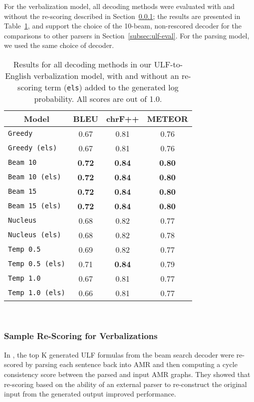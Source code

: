 For the verbalization model, all decoding methods were evaluated with and without the \elsmatch re-scoring described in Section~\ref{subsec:rescoring}; the results are presented in Table~\ref{T3}, and support the choice of the 10-beam, non-rescored decoder for the comparisons to other parsers in Section~\ref{subsec:ulf-eval}. For the parsing model, we used the same choice of decoder.

\vspace{5mm}

\begin{table}[ht]
\centering
\begin{tabular}{l|c|c|c}
\toprule
\multicolumn{1}{c|}{\textbf{Model}}&\multicolumn{1}{c|}{\textbf{BLEU}}&\multicolumn{1}{c|}{\textbf{chrF++}}&\multicolumn{1}{c}{\textbf{METEOR}}\\
\midrule
\texttt{Greedy}&0.67&0.81&0.76\\
\texttt{Greedy (els)}&0.67&0.81&0.76\\
\texttt{Beam 10}&\textbf{0.72}&\textbf{0.84}&\textbf{0.80}\\
\texttt{Beam 10 (els)}&\textbf{0.72}&\textbf{0.84}&\textbf{0.80}\\
\texttt{Beam 15}&\textbf{0.72}&\textbf{0.84}&\textbf{0.80}\\
\texttt{Beam 15 (els)}&\textbf{0.72}&\textbf{0.84}&\textbf{0.80}\\
\texttt{Nucleus}&0.68&0.82&0.77\\
\texttt{Nucleus (els)}&0.68&0.82&0.78\\
\texttt{Temp 0.5}&0.69&0.82&0.77\\
\texttt{Temp 0.5 (els)}&0.71&\textbf{0.84}&0.79\\
\texttt{Temp 1.0}&0.67&0.81&0.77\\
\texttt{Temp 1.0 (els)}&0.66&0.81&0.77\\
\bottomrule
\end{tabular}\\[10pt]
\caption{Results for all decoding methods in our ULF-to-English verbalization model, with and without an \elsmatch re-scoring term (\texttt{els}) added to the generated log probability. All scores are out of 1.0.\label{T3}}
\end{table}

\subsubsection{Sample Re-Scoring for Verbalizations}
\label{subsec:rescoring}
In \citep{gpt-too}, the top K generated ULF formulas from the beam search decoder were re-scored by parsing each sentence back into AMR and then computing a cycle consistency score between the parsed and input AMR graphs. They showed that re-scoring based on the ability of an external parser to re-construct the original input from the generated output improved performance.

